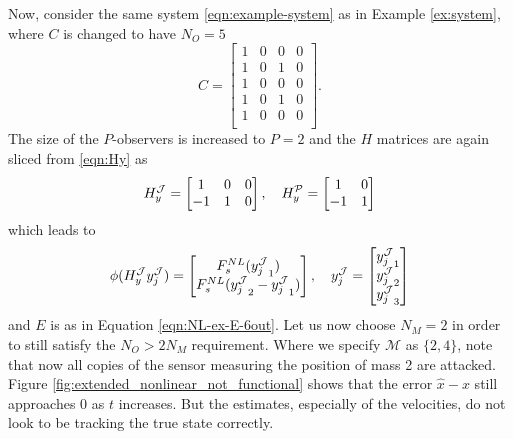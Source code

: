 \begin{example}\label{ex:ext-NL-double-mass}
    Now, consider the same system \eqref{eqn:example-system} as in Example \ref{ex:system}, where $C$ is changed to have $N_O=5$
    \begin{equation*}
        C = 
        \begin{bmatrix}
            1 & 0 & 0 & 0 \\
            1 & 0 & 1 & 0 \\
            1 & 0 & 0 & 0 \\
            1 & 0 & 1 & 0 \\
            1 & 0 & 0 & 0 \\
        \end{bmatrix}.
    \end{equation*}
    The size of the $P$-observers is increased to $P=2$ and the $H$ matrices are again sliced from \eqref{eqn:Hy} as
    \begin{equation*}
        H^{\mathcal{J}}_y =
        \begin{bmatrix}
            1 & 0 & 0 \\
            -1 & 1 & 0 \\
        \end{bmatrix}, \quad
        H^{\mathcal{P}}_y = 
        \begin{bmatrix}
            1 & 0 \\
            -1 & 1 
        \end{bmatrix}
    \end{equation*}
    which leads to
    \begin{equation*}
        \phi(H^{\mathcal{J}}_yy^{\mathcal{J}}_j) =
        \begin{bmatrix}
            F^{NL}_s({y^{\mathcal{J}}_j}_1) \\
            F^{NL}_s({y^{\mathcal{J}}_j}_2 - {y^{\mathcal{J}}_j}_1)
        \end{bmatrix}, \quad
        y^{\mathcal{J}}_j=
        \begin{bmatrix}
            {y^{\mathcal{J}}_j}_1 \\ {y^{\mathcal{J}}_j}_2 \\ {y^{\mathcal{J}}_j}_3 \\
        \end{bmatrix}
    \end{equation*}
    and $E$ is as in Equation \eqref{eqn:NL-ex-E-6out}. Let us now choose $N_M=2$ in order to still satisfy the $N_O>2N_M$ requirement. Where we specify $\mathcal{M}$ as $\{2,4\}$, note that now all copies of the sensor measuring the position of mass 2 are attacked. Figure \ref{fig:extended_nonlinear_not_functional} shows that the error $\hat{x}-x$ still approaches $0$ as $t$ increases. But the estimates, especially of the velocities, do not look to be tracking the true state correctly.

\end{example}
